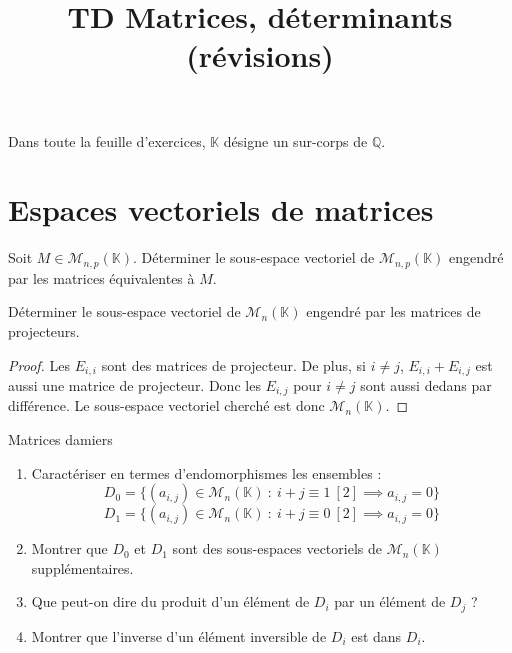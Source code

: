 \documentclass[french,a4paper]{article}
\title{TD Matrices, déterminants (révisions)}
\newcommand{\Q}{\mathbb{Q}}
\newcommand{\K}{\mathbb{K}}
\theoremstyle{plain}
\theoremstyle{definition}
\theoremstyle{remark}
\begin{document}
\maketitle

Dans toute la feuille d'exercices, $\K$ désigne un sur-corps de $\Q$.

\section{Espaces vectoriels de matrices}

\begin{ex}{}
	Soit $M\in\mathcal{M}_{n,p}(\K)$. Déterminer le sous-espace vectoriel de $\mathcal{M}_{n,p}(\K)$ engendré par les matrices équivalentes à $M$.
\end{ex}

\begin{ex}{}
	Déterminer le sous-espace vectoriel de $\mathcal{M}_n(\K)$ engendré par les matrices de projecteurs.
\end{ex}
\begin{proof}
	Les $E_{i,i}$ sont des matrices de projecteur. De plus, si $i\ne j$, $E_{i,i}+E_{i,j}$ est aussi une matrice de projecteur. Donc les $E_{i,j}$ pour $i\ne j$ sont aussi dedans par différence. Le sous-espace vectoriel cherché est donc $\mathcal{M}_n(\K)$.
\end{proof}

\begin{ex}{Matrices damiers}
	\begin{enumerate}
		\item Caractériser en termes d'endomorphismes les ensembles :
		$$D_0=\{(a_{i,j})\in\mathcal{M}_n(\K)\ : \ i+j\equiv 1\ [2]\implies a_{i,j}=0\}$$
		$$D_1=\{(a_{i,j})\in\mathcal{M}_n(\K)\ : \ i+j\equiv 0\ [2]\implies a_{i,j}=0\}$$
		\item Montrer que $D_0$ et $D_1$ sont des sous-espaces vectoriels de $\mathcal{M}_n(\K)$ supplémentaires.
		\item Que peut-on dire du produit d'un élément de $D_i$ par un élément de $D_j$ ?
		\item Montrer que l'inverse d'un élément inversible de $D_i$ est dans $D_i$.
	\end{enumerate}
\end{ex}
\end{document}

